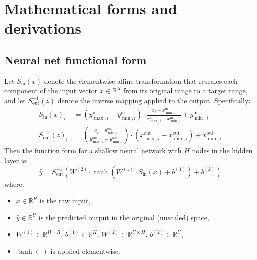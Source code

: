 \documentclass[a4paper,12pt]{article}
\begin{document}
\clearpage
\appendix

{\centering {} \par}

\setcounter{page}{1}
\setcounter{equation}{0} 

\section{Mathematical forms and derivations}
\label{app:maths}

\subsection{Neural net functional form}

Let \( S_{\text{in}}(x) \) denote the elementwise affine transformation that rescales each component of the input vector \( x \in \mathbb{R}^R \) from its original range to a target range, and let \( S_{\text{out}}^{-1}(z) \) denote the inverse mapping applied to the output. Specifically:
\begin{align*}
S_{\text{in}}(x)_i &= (y_{\max,i}^{\text{in}} - y_{\min,i}^{\text{in}}) \cdot \frac{x_i - x_{\min,i}^{\text{in}}}{x_{\max,i}^{\text{in}} - x_{\min,i}^{\text{in}}} + y_{\min,i}^{\text{in}} \\
S_{\text{out}}^{-1}(z)_i &= \left( \frac{z_i - y_{\min,i}^{\text{out}}}{y_{\max,i}^{\text{out}} - y_{\min,i}^{\text{out}}} \right) \cdot (x_{\max,i}^{\text{out}} - x_{\min,i}^{\text{out}}) + x_{\min,i}^{\text{out}}
\end{align*}
Then the function form for a shallow neural network with $H$ nodes in the hidden layer is:
\[
\hat{y} = S_{\text{out}}^{-1} \left( W^{(2)} \cdot \tanh\left( W^{(1)} \cdot S_{\text{in}}(x) + b^{(1)} \right) + b^{(2)} \right)
\]
where:
\begin{itemize}
  \item \( x \in \mathbb{R}^R \) is the raw input,
  \item \( \hat{y} \in \mathbb{R}^U \) is the predicted output in the original (unscaled) space,
  \item \( W^{(1)} \in \mathbb{R}^{H \times R} \), \( b^{(1)} \in \mathbb{R}^H \), \( W^{(2)} \in \mathbb{R}^{U \times H} \), \( b^{(2)} \in \mathbb{R}^U \),
  \item \( \tanh(\cdot) \) is applied elementwise.
\end{itemize}
\end{document}
